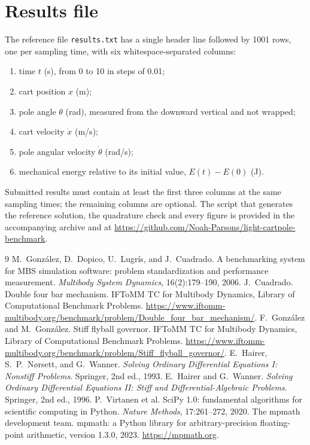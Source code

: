 \documentclass[11pt,a4paper]{article}
\begin{document}
\section*{Results file}

The reference file \texttt{results.txt} has a single header line followed by 1001
rows, one per sampling time, with six whitespace-separated columns:
\begin{enumerate}\setlength{\itemsep}{0pt}
\item time $t$ (s), from 0 to 10 in steps of 0.01;
\item cart position $x$ (m);
\item pole angle $\theta$ (rad), measured from the downward vertical and not wrapped;
\item cart velocity $\dot x$ (m/s);
\item pole angular velocity $\dot\theta$ (rad/s);
\item mechanical energy relative to its initial value, $E(t) - E(0)$ (J).
\end{enumerate}
Submitted results must contain at least the first three columns at the same
sampling times; the remaining columns are optional. The script that generates the
reference solution, the quadrature check and every figure is provided in the
accompanying archive and at
\url{https://github.com/Noah-Parsons/light-cartpole-benchmark}.

\begin{thebibliography}{9}\small
{}
M.~Gonz\'alez, D.~Dopico, U.~Lugr\'is, and J.~Cuadrado.
A benchmarking system for MBS simulation software: problem standardization and
performance measurement. \emph{Multibody System Dynamics}, 16(2):179--190, 2006.
J.~Cuadrado. Double four bar mechanism. IFToMM TC for Multibody Dynamics, Library
of Computational Benchmark Problems.
\url{https://www.iftomm-multibody.org/benchmark/problem/Double_four_bar_mechanism/}.
F.~Gonz\'alez and M.~Gonz\'alez. Stiff flyball governor. IFToMM TC for Multibody
Dynamics, Library of Computational Benchmark Problems.
\url{https://www.iftomm-multibody.org/benchmark/problem/Stiff_flyball_governor/}.
E.~Hairer, S.~P.~N{\o}rsett, and G.~Wanner.
\emph{Solving Ordinary Differential Equations I: Nonstiff Problems}.
Springer, 2nd ed., 1993.
E.~Hairer and G.~Wanner.
\emph{Solving Ordinary Differential Equations II: Stiff and Differential-Algebraic
Problems}. Springer, 2nd ed., 1996.
P.~Virtanen et al.
SciPy 1.0: fundamental algorithms for scientific computing in Python.
\emph{Nature Methods}, 17:261--272, 2020.
The mpmath development team.
mpmath: a Python library for arbitrary-precision floating-point arithmetic,
version 1.3.0, 2023. \url{https://mpmath.org}.
\end{thebibliography}
\end{document}
